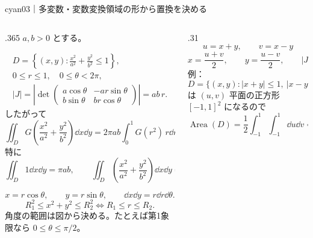 \begin{sheetframe}[50]{cyan}{03｜多変数・変数変換}{領域の形から置換を決める}
\begin{columns}[T,onlytextwidth]
\begin{column}{.365\textwidth}
\separator
{}
$a,b>0$ とする。
\begin{center}
\end{center}
\[
\begin{gathered}
D=\left\{(x,y):\frac{x^2}{a^2}+\frac{y^2}{b^2}\le1\right\},\\
0\le r\le1,\quad0\le\theta<2\pi,\\
|J|=\left|
\det\begin{pmatrix}
a\cos\theta&-ar\sin\theta\\
b\sin\theta&br\cos\theta
\end{pmatrix}\right|=ab\,r.
\end{gathered}
\]
したがって
\[
\boxed{
\iint_D
G\!\left(\frac{x^2}{a^2}+\frac{y^2}{b^2}\right)\dd x\dd y
=2\pi ab\int_0^1G(r^2)\,r\dd r.}
\]
特に
\[
\iint_D1\dd x\dd y=\pi ab,\qquad
\iint_D\left(\frac{x^2}{a^2}+\frac{y^2}{b^2}\right)\dd x\dd y
=\frac{\pi ab}{2}.
\]

\separator
{}
\[
x=r\cos\theta,\qquad y=r\sin\theta,\qquad
\dd x\dd y=r\dd r\dd\theta.
\]
\[
R_1^2\le x^2+y^2\le R_2^2
\iff R_1\le r\le R_2.
\]
角度の範囲は図から決める。たとえば第1象限なら
$0\le\theta\le\pi/2$。
\end{column}

\begin{column}{.31\textwidth}
\[
u=x+y,\qquad v=x-y
\]
\[
x=\frac{u+v}{2},\qquad
y=\frac{u-v}{2},\qquad |J|=\frac12.
\]
例：
\[
D=\{(x,y):|x+y|\le1,\ |x-y|\le1\}
\]
は $(u,v)$ 平面の正方形 $[-1,1]^2$ になるので
\[
\operatorname{Area}(D)
=\frac12\int_{-1}^1\!\int_{-1}^1\dd u\dd v=2.
\]


\end{column}
\end{columns}
\end{sheetframe}
